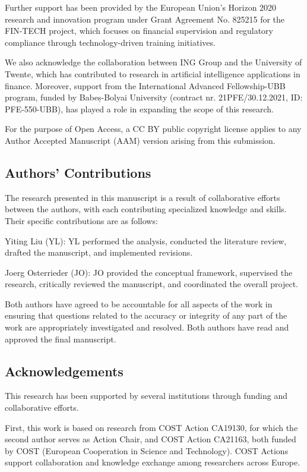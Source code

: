 \documentclass{article}[a4paper]
\begin{document}
Further support has been provided by the European Union’s Horizon 2020 research and innovation program under Grant Agreement No. 825215 for the FIN-TECH project, which focuses on financial supervision and regulatory compliance through technology-driven training initiatives.

We also acknowledge the collaboration between ING Group and the University of Twente, which has contributed to research in artificial intelligence applications in finance. Moreover, support from the International Advanced Fellowship-UBB program, funded by Babeș-Bolyai University (contract nr. 21PFE/30.12.2021, ID: PFE-550-UBB), has played a role in expanding the scope of this research.

For the purpose of Open Access, a CC BY public copyright license applies to any Author Accepted Manuscript (AAM) version arising from this submission.

\subsection*{Authors' Contributions}

The research presented in this manuscript is a result of collaborative efforts between the authors, with each contributing specialized knowledge and skills. Their specific contributions are as follows:

Yiting Liu (YL): YL performed the analysis, conducted the literature review, drafted the manuscript, and implemented revisions.

Joerg Osterrieder (JO): JO provided the conceptual framework, supervised the research, critically reviewed the manuscript, and coordinated the overall project.

Both authors have agreed to be accountable for all aspects of the work in ensuring that questions related to the accuracy or integrity of any part of the work are appropriately investigated and resolved. Both authors have read and approved the final manuscript.

\subsection*{Acknowledgements}

This research has been supported by several institutions through funding and collaborative efforts.

First, this work is based on research from COST Action CA19130, for which the second author serves as Action Chair, and COST Action CA21163, both funded by COST (European Cooperation in Science and Technology). COST Actions support collaboration and knowledge exchange among researchers across Europe.
\end{document}
